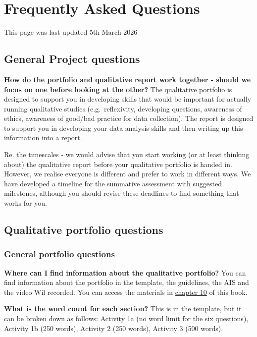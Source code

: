\documentclass[
  english,
  letterpaper,
  DIV=11,
  numbers=noendperiod]{scrreprt}
\begin{document}
\chapter{Frequently Asked Questions}\label{ch13_faqs}

This page was last updated 5th March 2026

\section{General Project questions}\label{general-project-questions}

\textbf{How do the portfolio and qualitative report work together -
should we focus on one before looking at the other?} The qualitative
portfolio is designed to support you in developing skills that would be
important for actually running qualitative studies (e.g.~reflexivity,
developing questions, awareness of ethics, awareness of good/bad
practice for data collection). The report is designed to support you in
developing your data analysis skills and then writing up this
information into a report.

Re. the timescales - we would advise that you start working (or at least
thinking about) the qualitative report before your qualitative portfolio
is handed in. However, we realise everyone is different and prefer to
work in different ways. We have developed a timeline for the summative
assessment with suggested milestones, although you should revise these
deadlines to find something that works for you.

\section{Qualitative portfolio
questions}\label{qualitative-portfolio-questions}

\subsection{General portfolio
questions}\label{general-portfolio-questions}

\textbf{Where can I find information about the qualitative portfolio?}
You can find information about the portfolio in the template, the
guidelines, the AIS and the video Wil recorded. You can access the
materials in \hyperref[ch10_group_project]{chapter 10} of this book.

\textbf{What is the word count for each section?} This is in the
template, but it can be broken down as follows: Activity 1a (no word
limit for the six questions), Activity 1b (250 words), Activity 2 (250
words), Activity 3 (500 words).
\end{document}
